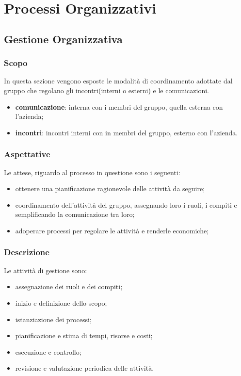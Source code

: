 \section{Processi Organizzativi}
\subsection{Gestione Organizzativa}
\subsubsection{Scopo}
In questa sezione vengono esposte le modalità di coordinamento adottate dal gruppo che regolano gli incontri(interni o esterni) e le comunicazioni.
\begin{itemize}
\item \textbf{comunicazione}: interna con i membri del gruppo, quella esterna con l'azienda;
\item \textbf{incontri}: incontri interni con in membri del gruppo, esterno con l'azienda.

\end{itemize}
\subsubsection{Aspettative}
Le attese, riguardo al processo in questione sono i seguenti: 
\begin{itemize}
\item ottenere una pianificazione ragionevole delle attività da seguire;
\item coordinamento dell'attività del gruppo, assegnando loro i ruoli, i compiti e semplificando la comunicazione tra loro;
\item adoperare processi per regolare le attività e renderle economiche;

\end{itemize}

\subsubsection{Descrizione}
Le attività di gestione sono: 
\begin{itemize}
\item assegnazione dei ruoli e dei compiti;
\item inizio e definizione dello scopo;
\item istanziazione dei processi;
\item pianificazione e stima di tempi, risorse e costi;
\item esecuzione e controllo;
\item revisione e valutazione periodica delle attività.
\end{itemize}

